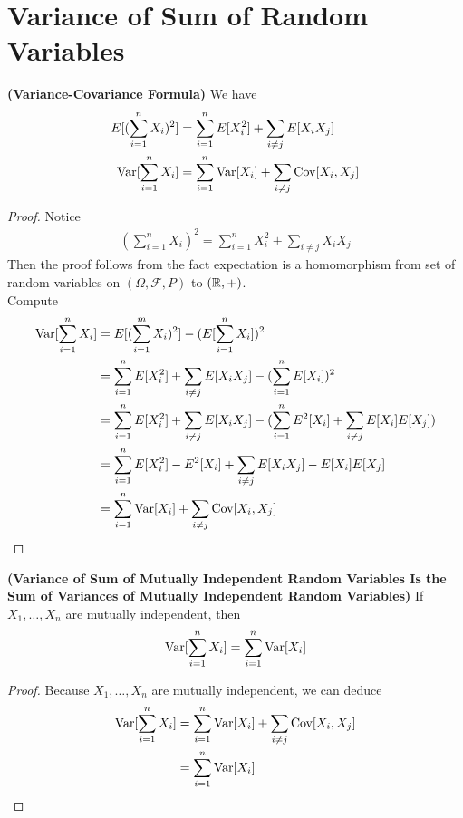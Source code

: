 \documentclass{report}
\begin{document}
\section{Variance of Sum of Random Variables}
\begin{theorem}
\label{4.5.1}
\textbf{(Variance-Covariance Formula)} We have
\begin{align*}
  E[(\sum_{i=1}^n X_i)^2]&=\sum_{i=1}^n E[X_i^2]+\sum_{i\neq j} E[X_iX_j]\\
  \text{Var}[\sum_{i=1}^n X_i]&=\sum_{i=1}^n \text{Var} [X_i]+\sum_{i\neq j} \text{Cov}[X_i,X_j]
\end{align*}
\end{theorem}
\begin{proof}
Notice 
\begin{align*}
  (\sum_{i=1}^n X_i)^2 = \sum_{i=1}^n X_i^2 + \sum_{i\neq j} X_iX_j
\end{align*}
Then the proof follows from the fact expectation is a homomorphism from set of random variables on $(\Omega,\mathcal{F},P)$ to $(\mathbb{R},+)$.\\

Compute 
\begin{align*}
  \text{Var} [\sum_{i=1}^n X_i]&= E[(\sum_{i=1}^m X_i)^2]-(E[\sum_{i=1}^n X_i])^2\\
  &=\sum_{i=1}^n E[X_i^2]+\sum_{i\neq j}E[X_iX_j]-(\sum_{i=1}^n E[X_i])^2\\
  &=\sum_{i=1}^n E[X_i^2]+\sum_{i\neq j}E[X_iX_j]-(\sum_{i=1}^n E^2[X_i] + \sum_{i\neq j}E[X_i]E[X_j])\\
  &=\sum_{i=1}^n E[X_i^2]-E^2[X_i]+\sum_{i\neq j}E[X_iX_j]-E[X_i]E[X_j]\\
  &=\sum_{i=1}^n \text{Var} [X_i]+\sum_{i \neq j} \text{Cov}[X_i,X_j]
\end{align*}
\end{proof}
\begin{corollary}
\label{4.5.2}
\textbf{(Variance of Sum of Mutually Independent Random Variables Is the Sum of Variances of Mutually Independent Random Variables)} If $X_1,\dots ,X_n$ are mutually independent, then 
\begin{align*}
  \text{Var} [\sum_{i=1}^n X_i]=\sum_{i=1}^n \text{Var} [X_i]
\end{align*}
\end{corollary}
\begin{proof}
Because $X_1,\dots ,X_n$ are mutually independent, we can deduce 
\begin{align*}
\text{Var} [\sum_{i=1}^n X_i]&=\sum_{i=1}^n \text{Var} [X_i]+\sum_{i\neq j}\text{Cov}[X_i,X_j]\\
&=\sum_{i=1}^n \text{Var} [X_i]
\end{align*}
\end{proof}
\end{document}
